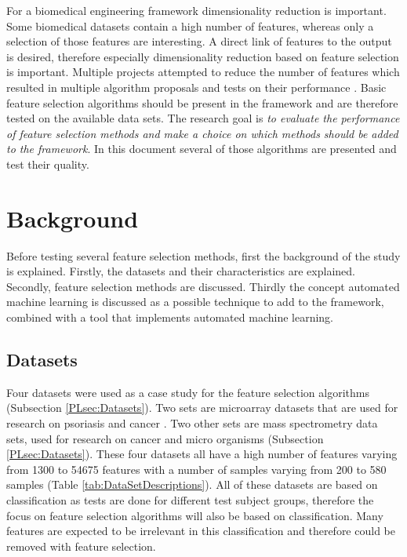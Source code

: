 \documentclass[10pt,a4paper]{report}
\begin{document}
	For a biomedical engineering framework dimensionality reduction is important.  Some biomedical datasets contain a high number of features, whereas only a selection of those features are interesting. A direct link of features to the output is desired, therefore especially dimensionality reduction based on feature selection is important. Multiple projects attempted to reduce the number of features \cite{baumgartner2006data, welthagen2005comprehensive} which resulted in multiple algorithm proposals \cite{lim2003planar, peng2010novel, biesiada2007feature, ding2005minimum} and tests on their performance \cite{catal2009investigating, liu2002comparative}. Basic feature selection algorithms should be present in the framework and are therefore tested on the available data sets. The research goal is \emph{to evaluate the performance of feature selection methods and make a choice on which methods should be added to the framework}. In this document several of those algorithms are presented and test their quality.
	
	\newpage
	\section{Background}
	\label{FSsec:Background}
	
	Before testing several feature selection methods, first the background of the study is explained. Firstly, the datasets and their characteristics are explained. Secondly, feature selection methods are discussed. Thirdly the concept automated machine learning is discussed as a possible technique to add to the framework, combined with a tool that implements automated machine learning.
	
	\subsection{Datasets}
	\label{FSsubsec:Datasets}
	
	Four datasets were used as a case study for the feature selection algorithms (Subsection \ref{PLsec:Datasets}). Two sets are microarray datasets that are used for research on psoriasis \cite{nair2009genome, suarez2012expanding, bigler2013cross, yao2008type} and cancer \cite{wojnarski2010rsctc}. Two other sets are mass spectrometry data sets, used for research on cancer \cite{NIPS2004_2728} and micro organisms \cite{doi:10.1093/bioinformatics/btu022} (Subsection \ref{PLsec:Datasets}). These four datasets all have a high number of features varying from 1300 to 54675 features with a number of samples varying from 200 to 580 samples (Table \ref{tab:DataSetDescriptions}). All of these datasets are based on classification as tests are done for different test subject groups, therefore the focus on feature selection algorithms will also be based on classification. Many features are expected to be irrelevant in this classification and therefore could be removed with feature selection.	
\end{document}
